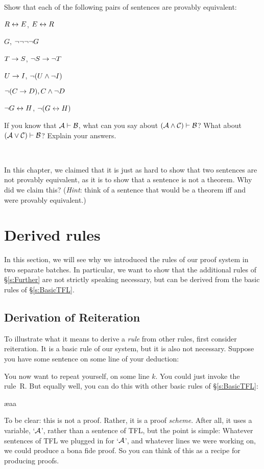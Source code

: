 \problempart
Show that each of the following pairs of sentences are provably equivalent:
\begin{earg}
\item $R \leftrightarrow E$, $E \leftrightarrow R$
\item $G$, $\neg\neg\neg\neg G$
\item $T\rightarrow S$, $\neg S \rightarrow \neg T$
\item $U \rightarrow I$, $\neg(U \wedge \neg I)$
\item $\neg (C \rightarrow D), C \wedge \neg D$
\item $\neg G \leftrightarrow H$, $\neg(G \leftrightarrow H)$ 
\end{earg}

\problempart
If you know that $\mathcal{A}\vdash\mathcal{B}$, what can you say about $(\mathcal{A}\wedge\mathcal{C})\vdash\mathcal{B}$? What about $(\mathcal{A}\vee\mathcal{C})\vdash\mathcal{B}$? Explain your answers.

\

\problempart In this chapter, we claimed that it is just as hard to show that two sentences are not provably equivalent, as it is to show that a sentence is not a theorem. Why did we claim this? (\emph{Hint}: think of a sentence that would be a theorem iff  and  were provably equivalent.)


\chapter{Derived rules}\label{s:Derived}
In this section, we will see why we introduced the rules of our proof system in two separate batches. In particular, we want to show that the additional rules of \S\ref{s:Further} are not strictly speaking necessary, but can be derived from the basic rules of \S\ref{s:BasicTFL}. 

\section{Derivation of Reiteration}
To illustrate what it means to derive a \emph{rule} from other rules, first consider reiteration. It is a basic rule of our system, but it is also not necessary. Suppose you have some sentence on some line of your deduction:
\begin{fitchproof}
\end{fitchproof}
You now want to repeat yourself, on some line $k$. You could just invoke the rule~R. But equally well, you can do this with other basic rules of \S\ref{s:BasicTFL}:
\begin{fitchproof}
	\ae{aa}
\end{fitchproof}
To be clear: this is not a proof. Rather, it is a proof \emph{scheme}. After all, it uses a variable, `$\mathcal{A}$', rather than a sentence of TFL, but the point is simple: Whatever sentences of TFL we plugged in for `$\mathcal{A}$', and whatever lines we were working on, we could produce a bona fide proof. So you can think of this as a recipe for producing proofs. 

